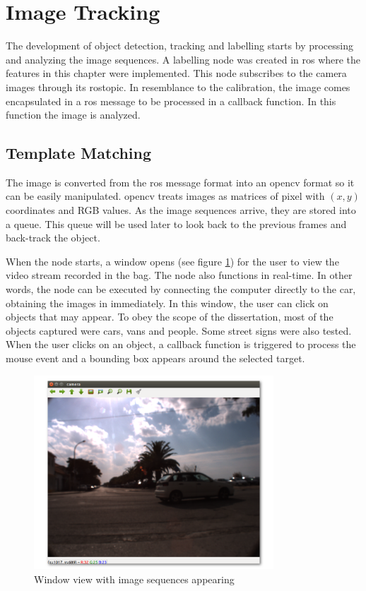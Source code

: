 \section{Image Tracking}

The development of object detection, tracking and labelling starts by processing and analyzing the image sequences. A labelling node was created in \gls{ros} where the features in this chapter were implemented. This node subscribes to the camera images through its rostopic. In resemblance to the calibration, the image comes encapsulated in a \gls{ros} message to be processed in a callback function. In this function the image is analyzed.

\subsection{Template Matching}

The image is converted from the \gls{ros} message format into an \gls{opencv} format so it can be easily manipulated. \gls{opencv} treats images as matrices of pixel with $(x,y)$ coordinates and RGB values. As the image sequences arrive, they are stored into a queue. This queue will be used later to look back to the previous frames and back-track the object. 

When the node starts, a window opens (see figure \ref{fig:view}) for the user to view the video stream recorded in the bag. The node also functions in real-time. In other words, the node can be executed by connecting the computer directly to the car, obtaining the images in immediately. In this window, the user can click on objects that may appear. To obey the scope of the dissertation, most of the objects captured were cars, vans and people. Some street signs were also tested. When the user clicks on an object, a callback function is triggered to process the mouse event and a bounding box appears around the selected target.

\begin{figure}[htp]
	
	\centering
	\includegraphics[width=0.8\textwidth]{caplabel/imgs/view.png}
	
	\caption{Window view with image sequences appearing}
	\label{fig:view}
	
\end{figure}


